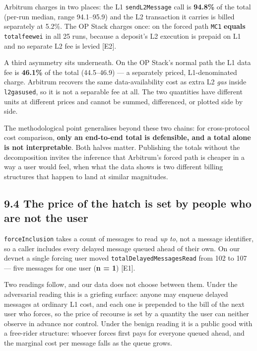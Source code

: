 \documentclass[conference]{IEEEtran}
\renewcommand{\_}{\textunderscore\allowbreak}
\begin{document}
Arbitrum charges in two places: the L1 \texttt{sendL2Message} call is
\textbf{94.8\%} of the total (per-run median, range 94.1--95.9) and the
L2 transaction it carries is billed separately at 5.2\%. The OP Stack
charges once: on the forced path \texttt{M\_C1} \textbf{equals}
\texttt{total\_fee\_wei} in all 25 runs, because a deposit's L2
execution is prepaid on L1 and no separate L2 fee is levied {[}E2{]}.

A third asymmetry sits underneath. On the OP Stack's normal path the L1
data fee is \textbf{46.1\%} of the total (44.5--46.9) --- a separately
priced, L1-denominated charge. Arbitrum recovers the same
data-availability cost as extra L2 \emph{gas} inside
\texttt{l2\_gas\_used}, so it is not a separable fee at all. The two
quantities have different units at different prices and cannot be
summed, differenced, or plotted side by side.

The methodological point generalises beyond these two chains: for
cross-protocol cost comparison, \textbf{only an end-to-end total is
defensible, and a total alone is not interpretable}. Both halves matter.
Publishing the totals without the decomposition invites the inference
that Arbitrum's forced path is cheaper in a way a user would feel, when
what the data shows is two different billing structures that happen to
land at similar magnitudes.

\subsection{9.4 The price of the hatch is set by people who are not the
user}\label{the-price-of-the-hatch-is-set-by-people-who-are-not-the-user}

\texttt{forceInclusion} takes a count of messages to read \emph{up to},
not a message identifier, so a caller includes every delayed message
queued ahead of their own. On our devnet a single forcing user moved
\texttt{totalDelayedMessagesRead} from 102 to 107 --- five messages for
one user (\textbf{n = 1}) {[}E1{]}.

Two readings follow, and our data does not choose between them. Under
the adversarial reading this is a griefing surface: anyone may enqueue
delayed messages at ordinary L1 cost, and each one is prepended to the
bill of the next user who forces, so the price of recourse is set by a
quantity the user can neither observe in advance nor control. Under the
benign reading it is a public good with a free-rider structure: whoever
forces first pays for everyone queued ahead, and the marginal cost per
message falls as the queue grows.
\end{document}
